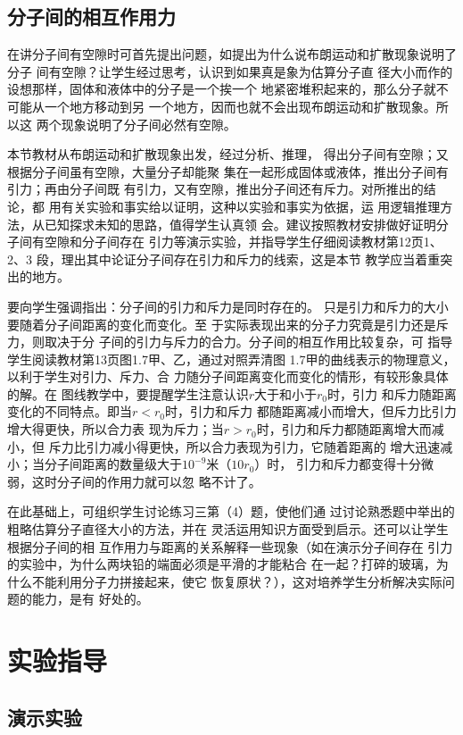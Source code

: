 \subsection{分子间的相互作用力}
在讲分子间有空隙时可首先提出问题，如提出为什么说布朗运动和扩散现象说明了分子
间有空隙？让学生经过思考，认识到如果真是象为估算分子直
径大小而作的设想那样，固体和液体中的分子是一个挨一个
地紧密堆积起来的，那么分子就不可能从一个地方移动到另
一个地方，因而也就不会出现布朗运动和扩散现象。所以这
两个现象说明了分子间必然有空隙。

本节教材从布朗运动和扩散现象出发，经过分析、推理，
得出分子间有空隙；又根据分子间虽有空隙，大量分子却能聚
集在一起形成固体或液体，推出分子间有引力；再由分子间既
有引力，又有空隙，推出分子间还有斥力。对所推出的结论，都
用有关实验和事实给以证明，这种以实验和事实为依据，运
用逻辑推理方法，从已知探求未知的思路，值得学生认真领
会。建议按照教材安排做好证明分子间有空隙和分子间存在
引力等演示实验，并指导学生仔细阅读教材第12页1、2、3
段，理出其中论证分子间存在引力和斥力的线索，这是本节
教学应当着重突出的地方。

要向学生强调指出：分子间的引力和斥力是同时存在的。
只是引力和斥力的大小要随着分子间距离的变化而变化。至
于实际表现出来的分子力究竟是引力还是斥力，则取决于分
子间的引力与斥力的合力。分子间的相互作用比较复杂，可
指导学生阅读教材第13页图1.7甲、乙，通过对照弄清图
1.7甲的曲线表示的物理意义，以利于学生对引力、斥力、合
力随分子间距离变化而变化的情形，有较形象具体的解。在
图线教学中，要提醒学生注意认识$r$大于和小于$r_0$时，引力
和斥力随距离变化的不同特点。即当$r<r_0$时，引力和斥力
都随距离减小而增大，但斥力比引力增大得更快，所以合力表
现为斥力；当$r>r_0$时，引力和斥力都随距离增大而减小，但
斥力比引力减小得更快，所以合力表现为引力，它随着距离的
增大迅速减小；当分子间距离的数量级大于$10^{-9}$米（$10r_0$）时，
引力和斥力都变得十分微弱，这时分子间的作用力就可以忽
略不计了。

在此基础上，可组织学生讨论练习三第（4）题，使他们通
过讨论熟悉题中举出的粗略估算分子直径大小的方法，并在
灵活运用知识方面受到启示。还可以让学生根据分子间的相
互作用力与距离的关系解释一些现象（如在演示分子间存在
引力的实验中，为什么两块铅的端面必须是平滑的才能粘合
在一起？打碎的玻璃，为什么不能利用分子力拼接起来，使它
恢复原状？），这对培养学生分析解决实际问题的能力，是有
好处的。

\section{实验指导}
\subsection{演示实验}
